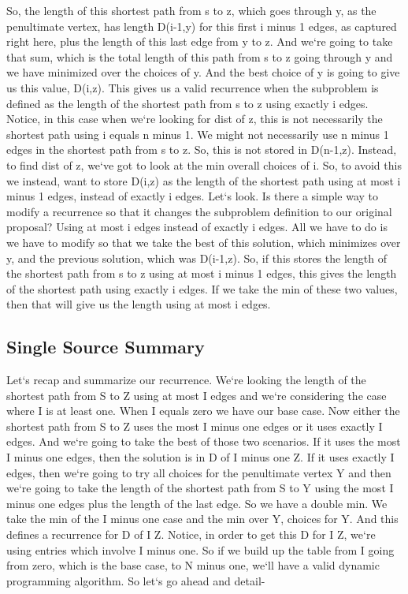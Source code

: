 So, the length of this shortest path from s to z, which goes through y, as the penultimate vertex, has length D(i-1,y) for this first i minus 1 edges, as captured right here, plus the length of this last edge from y to z.
And we`re going to take that sum, which is the total length of this path from s to z going through y and we have minimized over the choices of y.
And the best choice of y is going to give us this value, D(i,z).
This gives us a valid recurrence when the subproblem is defined as the length of the shortest path from s to z using exactly i edges.
Notice, in this case when we`re looking for dist of z, this is not necessarily the shortest path using i equals n minus 1.
We might not necessarily use n minus 1 edges in the shortest path from s to z.
So, this is not stored in D(n-1,z).
Instead, to find dist of z, we`ve got to look at the min overall choices of i.
So, to avoid this we instead, want to store D(i,z) as the length of the shortest path using at most i minus 1 edges, instead of exactly i edges.
Let`s look.
Is there a simple way to modify a recurrence so that it changes the subproblem definition to our original proposal? Using at most i edges instead of exactly i edges.
All we have to do is we have to modify so that we take the best of this solution, which minimizes over y, and the previous solution, which was D(i-1,z).
So, if this stores the length of the shortest path from s to z using at most i minus 1 edges, this gives the length of the shortest path using exactly i edges.
If we take the min of these two values, then that will give us the length using at most i edges.

\subsection{Single Source  Summary}
Let`s recap and summarize our recurrence.
We`re looking the length of the shortest path from S to Z using at most I edges and we`re considering the case where I is at least one.
When I equals zero we have our base case.
Now either the shortest path from S to Z uses the most I minus one edges or it uses exactly I edges.
And we`re going to take the best of those two scenarios.
If it uses the most I minus one edges, then the solution is in D of I minus one Z\@.
If it uses exactly I edges, then we`re going to try all choices for the penultimate vertex Y and then we`re going to take the length of the shortest path from S to Y using the most I minus one edges plus the length of the last edge.
So we have a double min.
We take the min of the I minus one case and the min over Y, choices for Y\@.
And this defines a recurrence for D of I Z\@.
Notice, in order to get this D for I Z, we`re using entries which involve I minus one.
So if we build up the table from I going from zero, which is the base case, to N minus one, we`ll have a valid dynamic programming algorithm.
So let`s go ahead and detail-

